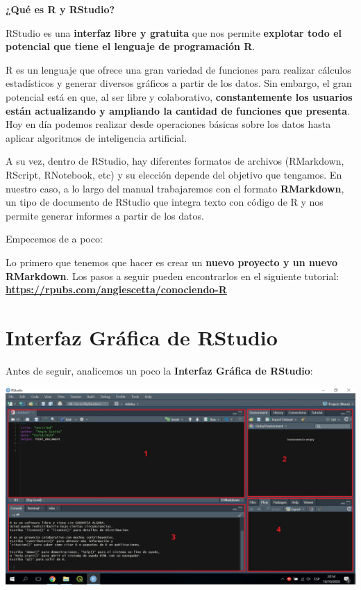 \documentclass[
  spanish,
]{book}
\begin{document}
\textbf{¿Qué es R y RStudio?}

RStudio es una \textbf{interfaz libre y gratuita} que nos permite \textbf{explotar todo el potencial que tiene el lenguaje de programación R}.

R es un lenguaje que ofrece una gran variedad de funciones para realizar cálculos estadísticos y generar diversos gráficos a partir de los datos. Sin embargo, el gran potencial está en que, al ser libre y colaborativo, \textbf{constantemente los usuarios están actualizando y ampliando la cantidad de funciones que presenta}. Hoy en día podemos realizar desde operaciones básicas sobre los datos hasta aplicar algoritmos de inteligencia artificial.

A su vez, dentro de RStudio, hay diferentes formatos de archivos (RMarkdown, RScript, RNotebook, etc) y su elección depende del objetivo que tengamos. En nuestro caso, a lo largo del manual trabajaremos con el formato \textbf{RMarkdown}, un tipo de documento de RStudio que integra texto con código de R y nos permite generar informes a partir de los datos.

Empecemos de a poco:

Lo primero que tenemos que hacer es crear un \textbf{nuevo proyecto y un nuevo RMarkdown}. Los pasos a seguir pueden encontrarlos en el siguiente tutorial: \textbf{\url{https://rpubs.com/angiescetta/conociendo-R}}

\hypertarget{interfaz-gruxe1fica-de-rstudio}{%
\section{Interfaz Gráfica de RStudio}\label{interfaz-gruxe1fica-de-rstudio}}

Antes de seguir, analicemos un poco la \textbf{Interfaz Gráfica de RStudio}:

\includegraphics{images/000_0.jpg}
\end{document}
